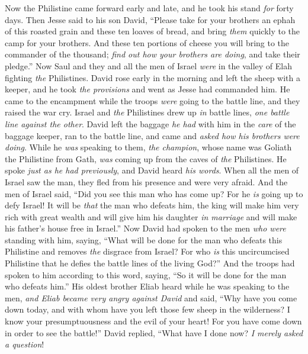 \begin{biblechapter}
\verse Now the Philistine came forward early and late, and he took his stand \textit{for} forty days.
\verse Then Jesse said to his son David, “Please take for your brothers an ephah of this roasted grain and these ten loaves of bread, and bring \textit{them} quickly to the camp for your brothers.
\verse And these ten portions of cheese you will bring to the commander of the thousand; \textit{find out how your brothers are doing}, and take their pledge.”
\verse Now Saul and they and all the men of Israel \textit{were} in the valley of Elah fighting \textit{the} Philistines.
\verse David rose early in the morning and left the sheep with a keeper, and he took \textit{the provisions} and went as Jesse had commanded him. He came to the encampment while the troops \textit{were} going to the battle line, and they raised the war cry.
\verse Israel and \textit{the} Philistines drew up \textit{in} battle lines, \textit{one battle line against the other}.
\verse David left the baggage \textit{he had} with him in the \textit{care} of the baggage keeper, ran to the battle line, and came and \textit{asked how his brothers were doing}.
\verse While he \textit{was} speaking to them, \textit{the champion}, whose name was Goliath the Philistine from Gath, \textit{was} coming up from the caves of \textit{the} Philistines. He spoke \textit{just as he had previously}, and David heard \textit{his words}.
\verse When all the men of Israel saw the man, they fled from his presence and were very afraid.
\verse And the men of Israel said, “Did you see this man who has come up? For he \textit{is} going up to defy Israel! It will be \textit{that} the man who defeats him, the king will make him very rich with great wealth and will give him his daughter \textit{in marriage} and will make his father’s house free in Israel.”
\verse Now David had spoken to the men \textit{who were} standing with him, saying, “What will be done for the man who defeats this Philistine and removes \textit{the} disgrace from Israel? For who \textit{is} this uncircumcised Philistine that he defies the battle lines of the living God?”
\verse And the troops had spoken to him according to this word, saying, “So it will be done for the man who defeats him.”
\verse His oldest brother Eliab heard while he was speaking to the men, \textit{and Eliab became very angry against David} and said, “Why have you come down today, and with whom have you left those few sheep in the wilderness? I know your presumptuousness and the evil of your heart! For you have come down in order to see the battle!”
\verse David replied, “What have I done now? \textit{I merely asked a question}!

\end{biblechapter}
